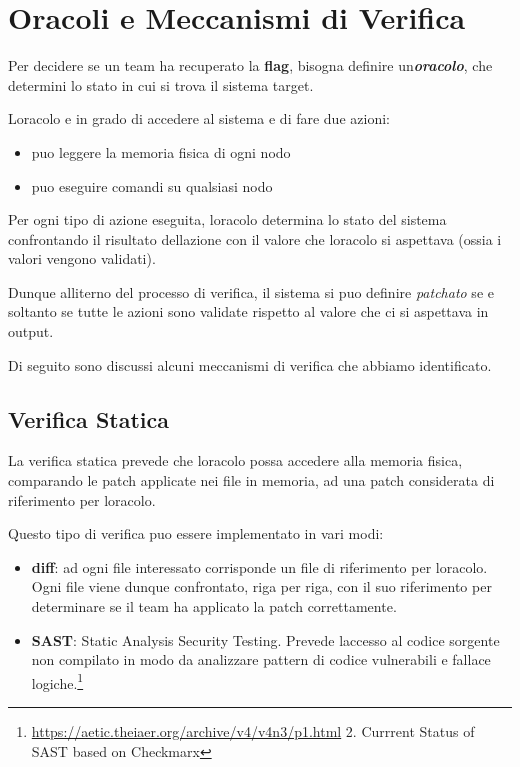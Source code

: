\section{Oracoli e Meccanismi di
Verifica}\label{oracoli-e-meccanismi-di-verifica}

Per decidere se un team ha recuperato la \textbf{flag}, bisogna definire
un\textquotesingle{}\emph{\textbf{oracolo}}, che determini lo stato in
cui si trova il sistema target.

L\textquotesingle oracolo e\textquotesingle{} in grado di accedere al
sistema e di fare due azioni:

\begin{itemize}
\tightlist
\item
  puo\textquotesingle{} leggere la memoria fisica di ogni nodo
\item
  puo\textquotesingle{} eseguire comandi su qualsiasi nodo
\end{itemize}

Per ogni tipo di azione eseguita, l\textquotesingle oracolo determina lo
stato del sistema confrontando il risultato dell\textquotesingle azione
con il valore che l\textquotesingle oracolo si aspettava (ossia i valori
vengono validati).

Dunque all\textquotesingle iterno del processo di verifica, il sistema
si puo\textquotesingle{} definire \emph{patchato} se e soltanto se tutte
le azioni sono validate rispetto al valore che ci si aspettava in
output.

Di seguito sono discussi alcuni meccanismi di verifica che abbiamo
identificato.

\subsection{Verifica Statica}\label{verifica-statica}

La verifica statica prevede che l\textquotesingle oracolo possa accedere
alla memoria fisica, comparando le patch applicate nei file in memoria,
ad una patch considerata di riferimento per l\textquotesingle oracolo.

Questo tipo di verifica puo\textquotesingle{} essere implementato in
vari modi:

\begin{itemize}
\tightlist
\item
  \textbf{diff}: ad ogni file interessato corrisponde un file di
  riferimento per l\textquotesingle oracolo. Ogni file viene dunque
  confrontato, riga per riga, con il suo riferimento per determinare se
  il team ha applicato la patch correttamente.
\item
  \textbf{SAST}: Static Analysis Security Testing. Prevede
  l\textquotesingle accesso al codice sorgente non compilato in modo da
  analizzare pattern di codice vulnerabili e fallace logiche.\footnote{\label{fn:ref_1}\url{https://aetic.theiaer.org/archive/v4/v4n3/p1.html}
    2. Currrent Status of SAST based on Checkmarx}
\end{itemize}

